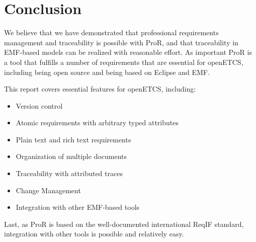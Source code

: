 \documentclass{template/openetcs_report}
\begin{document}
\chapter{Conclusion}

We believe that we have demonstrated that professional requirements management and traceability is possible with ProR, and that traceability in EMF-based models can be realized with reasonable effort.  As important ProR is a tool that fulfills a number of requirements that are essential for openETCS, including being open source and being based on Eclipse and EMF.

This report covers essential features for openETCS, including:

\begin{itemize}
\item Version control
\item Atomic requirements with arbitrary typed attributes
\item Plain text and rich text requirements
\item Organization of multiple documents
\item Traceability with attributed traces
\item Change Management
\item Integration with other EMF-based tools
\end{itemize}

Last, as ProR is based on the well-documented international ReqIF standard, integration with other tools is possible and relatively easy.





\appendix




\end{document}
